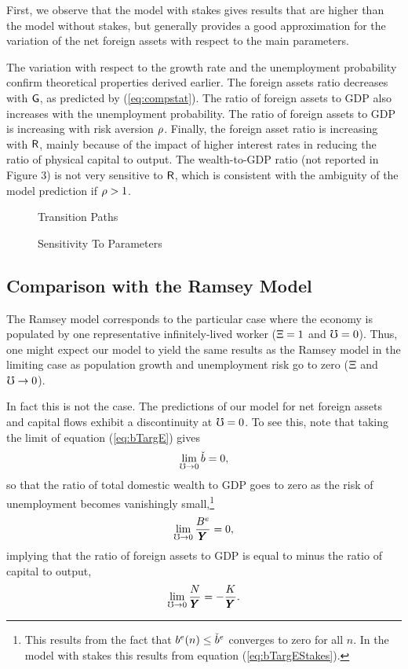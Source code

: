 \documentclass[titlepage,abstract,letterpaper]{econtex}
\renewcommand{\GDPLev}{\ensuremath{\pmb{Y}}}
\begin{document}
First, we observe that the model with stakes gives results that are higher than the model without stakes, but generally provides a good approximation for the variation of the net foreign assets with respect to the main parameters.

The variation with respect to the growth rate and the unemployment probability confirm theoretical properties derived earlier. The foreign assets ratio decreases with $\mathsf{G}$, as predicted by (\ref{eq:compstat}). The ratio of foreign assets to GDP also increases with the unemployment probability.
The ratio of foreign assets to GDP is increasing with risk aversion $\rho$.
Finally, the foreign asset ratio is increasing with $\mathsf{R}$, mainly because of the impact of higher interest rates in reducing the ratio of physical capital to output. The wealth-to-GDP ratio (not reported in Figure 3) is not very sensitive to $\mathsf{R}$, which is consistent with the ambiguity of the model prediction if $\rho >1$.

\medskip

\begin{figure}
\caption{Transition Paths}\label{fig:paths}
\end{figure}

\medskip
\begin{figure}
\caption{Sensitivity To Parameters}\label{fig:sensitivity}
\end{figure}


\medskip

\subsection{Comparison with the Ramsey Model}

The Ramsey model corresponds to the particular case where the economy is populated by one representative infinitely-lived worker ($\Xi=1$ and $\mho=0$). Thus, one might expect our model to yield the same results as the Ramsey model in the limiting case as population growth and unemployment risk go to zero ($\Xi$ and $\mho \rightarrow 0$).

In fact this is not the case. The predictions of our model for net foreign assets and capital flows exhibit a discontinuity at $\mho=0$. To see this, note that taking the limit of equation (\ref{eq:bTargE}) gives
\begin{equation*}
\lim_{\mho \rightarrow 0} \check{b}=0,
\end{equation*}
so that the ratio of total domestic wealth to GDP goes to zero as the risk of unemployment becomes vanishingly small,\footnote{This results from the fact that $b^{e}(n) \leq \check{b}^{e}$ converges to zero for all $n$. In the model with stakes this results from equation (\ref{eq:bTargEStakes}). }
\begin{equation*}
\lim_{\urate \rightarrow 0} \frac{\BLevE}{\GDPLev}=0,
\end{equation*}
implying that the ratio of foreign assets to GDP is equal to minus the ratio of capital to output,
\begin{equation}
\lim_{\urate \rightarrow 0} \frac{\NFALev}{\GDPLev}=-\frac{\KLev}{\GDPLev}.
\label{eq:NFARatIfUGt0}
\end{equation}
\end{document}
